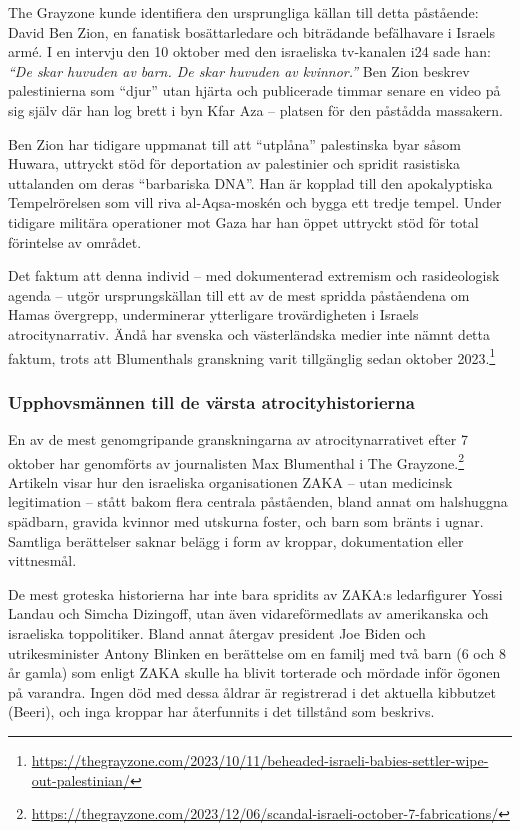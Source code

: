 \documentclass[12pt]{article}
\begin{document}
The Grayzone kunde identifiera den ursprungliga källan till detta påstående: David Ben Zion, en fanatisk bosättarledare och biträdande befälhavare i Israels armé. I en intervju den 10 oktober med den israeliska tv-kanalen i24 sade han: \textit{“De skar huvuden av barn. De skar huvuden av kvinnor.”} Ben Zion beskrev palestinierna som “djur” utan hjärta och publicerade timmar senare en video på sig själv där han log brett i byn Kfar Aza – platsen för den påstådda massakern. 

Ben Zion har tidigare uppmanat till att “utplåna” palestinska byar såsom Huwara, uttryckt stöd för deportation av palestinier och spridit rasistiska uttalanden om deras “barbariska DNA”. Han är kopplad till den apokalyptiska Tempelrörelsen som vill riva al-Aqsa-moskén och bygga ett tredje tempel. Under tidigare militära operationer mot Gaza har han öppet uttryckt stöd för total förintelse av området.

Det faktum att denna individ – med dokumenterad extremism och rasideologisk agenda – utgör ursprungskällan till ett av de mest spridda påståendena om Hamas övergrepp, underminerar ytterligare trovärdigheten i Israels atrocitynarrativ. Ändå har svenska och västerländska medier inte nämnt detta faktum, trots att Blumenthals granskning varit tillgänglig sedan oktober 2023.\footnote{\url{https://thegrayzone.com/2023/10/11/beheaded-israeli-babies-settler-wipe-out-palestinian/}}

\subsubsection*{Upphovsmännen till de värsta atrocityhistorierna}

En av de mest genomgripande granskningarna av atrocitynarrativet efter 7 oktober har genomförts av journalisten Max Blumenthal i The Grayzone.\footnote{\url{https://thegrayzone.com/2023/12/06/scandal-israeli-october-7-fabrications/}} Artikeln visar hur den israeliska organisationen ZAKA – utan medicinsk legitimation – stått bakom flera centrala påståenden, bland annat om halshuggna spädbarn, gravida kvinnor med utskurna foster, och barn som bränts i ugnar. Samtliga berättelser saknar belägg i form av kroppar, dokumentation eller vittnesmål.  

De mest groteska historierna har inte bara spridits av ZAKA:s ledarfigurer Yossi Landau och Simcha Dizingoff, utan även vidareförmedlats av amerikanska och israeliska toppolitiker. Bland annat återgav president Joe Biden och utrikesminister Antony Blinken en berättelse om en familj med två barn (6 och 8 år gamla) som enligt ZAKA skulle ha blivit torterade och mördade inför ögonen på varandra. Ingen död med dessa åldrar är registrerad i det aktuella kibbutzet (Beeri), och inga kroppar har återfunnits i det tillstånd som beskrivs.
\end{document}
